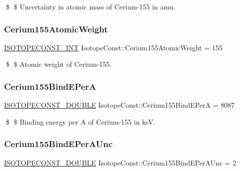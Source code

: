 \$ \$ Uncertainty in atomic mass of Cerium-\/155 in amu. \mbox{\label{group___isotope_const-_cerium-_ce155_gae65654aa1d2918ffeab0b800d4e6127e}} 
\subsubsection{\texorpdfstring{Cerium155\+Atomic\+Weight}{Cerium155AtomicWeight}}
{\footnotesize\ttfamily \mbox{\hyperlink{group___isotope_const-_macros_ga5f18360b3e99483a35c32d789e62621c}{I\+S\+O\+T\+O\+P\+E\+C\+O\+N\+S\+T\+\_\+\+I\+NT}} Isotope\+Const\+::\+Cerium155\+Atomic\+Weight = 155}

\$ \$ Atomic weight of Cerium-\/155. \mbox{\label{group___isotope_const-_cerium-_ce155_gabf6736d049a21782c628ba1f3927fe46}} 
\subsubsection{\texorpdfstring{Cerium155\+Bind\+E\+PerA}{Cerium155BindEPerA}}
{\footnotesize\ttfamily \mbox{\hyperlink{group___isotope_const-_macros_ga8f45a7272ce02c0b4c65c44636ed719a}{I\+S\+O\+T\+O\+P\+E\+C\+O\+N\+S\+T\+\_\+\+D\+O\+U\+B\+LE}} Isotope\+Const\+::\+Cerium155\+Bind\+E\+PerA = 8087}

\$ \$ Binding energy per A of Cerium-\/155 in keV. \mbox{\label{group___isotope_const-_cerium-_ce155_gabb41da45ea61e27d9e3bb5c9b782bbca}} 
\subsubsection{\texorpdfstring{Cerium155\+Bind\+E\+Per\+A\+Unc}{Cerium155BindEPerAUnc}}
{\footnotesize\ttfamily \mbox{\hyperlink{group___isotope_const-_macros_ga8f45a7272ce02c0b4c65c44636ed719a}{I\+S\+O\+T\+O\+P\+E\+C\+O\+N\+S\+T\+\_\+\+D\+O\+U\+B\+LE}} Isotope\+Const\+::\+Cerium155\+Bind\+E\+Per\+A\+Unc = 2}

